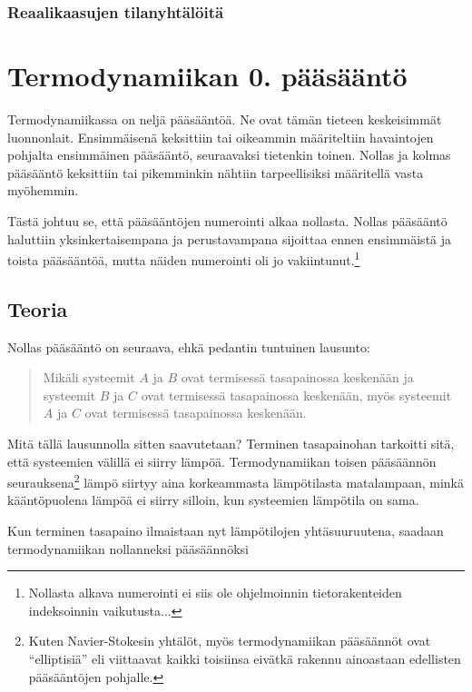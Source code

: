 \documentclass[12pt,a4paper,finnish]{book}
\begin{document}
\subsection{Reaalikaasujen tilanyhtälöitä}

\chapter{Termodynamiikan 0. pääsääntö} %

Termodynamiikassa on neljä pääsääntöä. Ne ovat tämän tieteen keskeisimmät luonnonlait. Ensimmäisenä 
keksittiin tai oikeammin määriteltiin havaintojen pohjalta ensimmäinen pääsääntö, seuraavaksi tietenkin 
toinen. Nollas ja kolmas pääsääntö keksittiin tai pikemminkin nähtiin tarpeellisiksi määritellä vasta 
myöhemmin. 

Tästä johtuu se, että pääsääntöjen numerointi alkaa nollasta. Nollas 
pääsääntö haluttiin yksinkertaisempana ja perustavampana sijoittaa ennen ensimmäistä ja toista 
pääsääntöä, mutta näiden numerointi oli jo vakiintunut.\footnote{Nollasta alkava numerointi ei siis 
ole ohjelmoinnin tietorakenteiden indeksoinnin vaikutusta...}

\section{Teoria} %

Nollas pääsääntö on seuraava, ehkä pedantin tuntuinen lausunto:

\begin{quote}
 Mikäli systeemit $A$ ja $B$ ovat termisessä tasapainossa keskenään ja systeemit $B$ ja $C$ ovat 
 termisessä tasapainossa keskenään, myös systeemit $A$ ja $C$ ovat termisessä tasapainossa keskenään.
\end{quote}

Mitä tällä lausunnolla sitten saavutetaan? Terminen tasapainohan tarkoitti sitä, että systeemien 
välillä ei siirry lämpöä. Termodynamiikan toisen pääsäännön seurauksena\footnote{Kuten Navier-Stokesin 
yhtälöt, myös termodynamiikan pääsäännöt ovat ``elliptisiä'' eli viittaavat kaikki toisiinsa eivätkä 
rakennu ainoastaan edellisten pääsääntöjen pohjalle.} lämpö siirtyy aina korkeammasta 
lämpötilasta matalampaan, minkä kääntöpuolena lämpöä ei siirry silloin, kun systeemien lämpötila 
on sama.

Kun terminen tasapaino ilmaistaan nyt lämpötilojen yhtäsuuruutena, saadaan termodynamiikan nollanneksi 
pääsäännöksi
\end{document}
